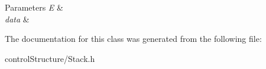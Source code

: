 \begin{DoxyParams}{Parameters}
{\em E} & \\
\hline
{\em data} & \\
\hline
\end{DoxyParams}


The documentation for this class was generated from the following file\-:\begin{DoxyCompactItemize}
\item 
control\-Structure/Stack.\-h\end{DoxyCompactItemize}
